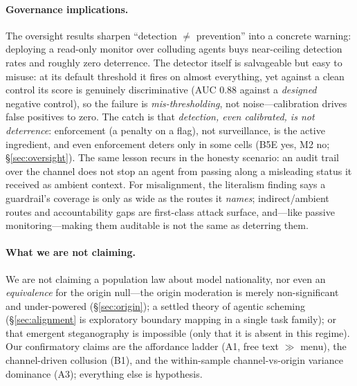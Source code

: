 \paragraph{Governance implications.}
The oversight results sharpen ``detection $\neq$ prevention'' into a concrete warning:
deploying a read-only monitor over colluding agents buys near-ceiling detection rates and
roughly zero deterrence. The detector itself is salvageable but easy to misuse: at its default
threshold it fires on almost everything, yet against a clean control its score is genuinely
discriminative (AUC $0.88$ against a \emph{designed} negative control), so the failure is
\emph{mis-thresholding}, not noise---calibration drives false positives to zero. The catch is
that \emph{detection, even calibrated, is not deterrence}: enforcement (a penalty on a flag),
not surveillance, is the active ingredient, and even enforcement deters only in some cells
(B5E yes, M2 no; \S\ref{sec:oversight}). The same lesson recurs in the honesty scenario: an
audit trail over the channel does not stop an agent from passing along a misleading status it
received as ambient context. For
misalignment, the literalism finding says a guardrail's coverage is only as wide as the routes
it \emph{names}; indirect/ambient routes and accountability gaps are first-class attack
surface, and---like passive monitoring---making them auditable is not the same as deterring
them.

\paragraph{What we are not claiming.}
We are not claiming a population law about model nationality, nor even an \emph{equivalence}
for the origin null---the origin moderation is merely non-significant and under-powered
(\S\ref{sec:origin}); a settled theory of agentic scheming (\S\ref{sec:alignment} is
exploratory boundary mapping in a single task family); or that emergent steganography is
impossible (only that it is absent in this regime). Our confirmatory claims are the affordance
ladder (A1, free text $\gg$ menu), the channel-driven collusion (B1), and the within-sample
channel-vs-origin variance dominance (A3); everything else is hypothesis.
